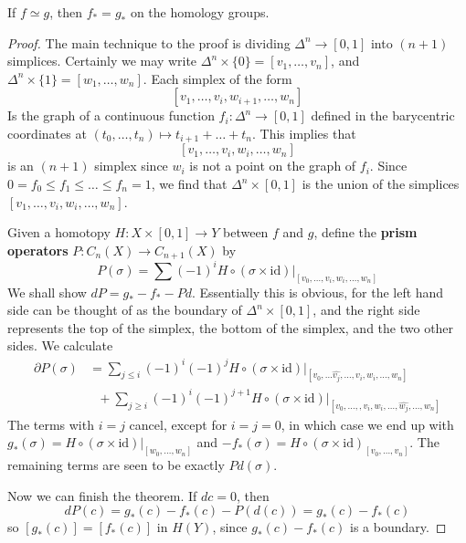 \begin{theorem}
    If $f \simeq g$, then $f_* = g_*$ on the homology groups.
\end{theorem}
\begin{proof}
    The main technique to the proof is dividing $\Delta^n \to [0,1]$ into $(n+1)$ simplices. Certainly we may write $\Delta^n \times \{ 0 \} = [v_1, \dots, v_n]$, and $\Delta^n \times \{ 1 \} = [w_1, \dots, w_n]$. Each simplex of the form
    \[ [v_1, \dots, v_i, w_{i+1}, \dots, w_n] \]
    Is the graph of a continuous function $f_i: \Delta^n \to [0,1]$ defined in the barycentric coordinates at $(t_0, \dots, t_n) \mapsto t_{i+1} + \dots + t_n$. This implies that
    \[ [v_1, \dots, v_i, w_i, \dots, w_n] \]
    is an $(n+1)$ simplex since $w_i$ is not a point on the graph of $f_i$. Since $0 = f_0 \leq f_1 \leq \dots \leq f_n = 1$, we find that $\Delta^n \times [0,1]$ is the union of the simplices $[v_1, \dots, v_i, w_i, \dots, w_n]$.

    Given a homotopy $H: X \times [0,1] \to Y$ between $f$ and $g$, define the {\bf prism operators} $P: C_n(X) \to C_{n+1}(X)$ by
    \[ P(\sigma) = \sum (-1)^i H \circ (\sigma \times \text{id})|_{[v_0, \dots, v_i, w_i, \dots, w_n]} \]
    We shall show $d P = g_* - f_* - P d$. Essentially this is obvious, for the left hand side can be thought of as the boundary of $\Delta^n \times [0,1]$, and the right side represents the top of the simplex, the bottom of the simplex, and the two other sides. We calculate
    \begin{align*}
        \partial P(\sigma) &= \sum_{j \leq i} (-1)^i (-1)^j H \circ (\sigma \times \text{id})|_{[v_0, \dots \hat{v_j}, \dots, v_i, w_i, \dots, w_n]}\\
        &\ \ \ + \sum_{j \geq i} (-1)^i (-1)^{j+1} H \circ (\sigma \times \text{id})|_{[v_0, \dots, , v_i, w_i, \dots, \hat{w_j}, \dots, w_n]}
    \end{align*}
    The terms with $i = j$ cancel, except for $i = j = 0$, in which case we end up with $g_*(\sigma) = H \circ (\sigma \times \text{id})|_{[w_0, \dots, w_n]}$ and $- f_*(\sigma) = H \circ (\sigma \times \text{id})_{[v_0, \dots, v_n]}$. The remaining terms are seen to be exactly $P d(\sigma)$.

    Now we can finish the theorem. If $dc = 0$, then
    \[ dP(c) = g_*(c) - f_*(c) - P(d(c)) = g_*(c) - f_*(c) \]
    so $[g_*(c)] = [f_*(c)]$ in $H(Y)$, since $g_*(c) - f_*(c)$ is a boundary.
\end{proof}

